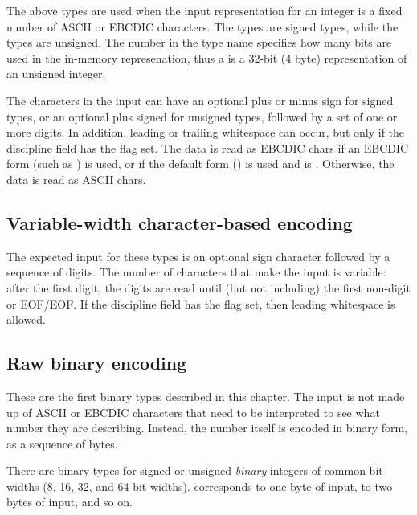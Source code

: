 The above types are used when the input representation for an integer
is a fixed number of ASCII or EBCDIC characters.  The  types are
signed types, while the  types are unsigned.  The number in the
type name specifies how many bits are used in the in-memory
represenation, thus a  is a 32-bit (4 byte) representation of
an unsigned integer.

The characters in the input can have an optional plus or minus sign for
signed types, or an optional plus signed for unsigned types, followed
by a set of one or more digits.   In addition, leading or
trailing whitespace can occur, but only if the \pads{} discipline field
 has the  flag set.
The data is read as EBCDIC chars if an EBCDIC
form (such as ) is used, or if the default form () is used and
 is .  Otherwise, the data is
read as ASCII chars.

\subsection{Variable-width character-based encoding}

\aedBegin{}
\aedEnd{}

The expected input for these types is an optional sign character
followed by a sequence of digits.  The number of characters that make
the input is variable: after the first digit, the digits are read
until (but not including) the first non-digit or EOF/EOF.
If the \pads discipline field
 has the  flag set, then
leading whitespace is allowed.

\subsection{Raw binary encoding}

\bBegin{}
\bEnd{}

These are the first binary types described in this chapter. The input
is not made up of ASCII or EBCDIC characters that need to be interpreted
to see what number they are describing.  Instead, the number itself is
encoded in binary form, as a sequence of bytes.  

There are binary types for signed or unsigned {\em binary\/} integers
of common bit widths (8, 16, 32, and 64 bit widths).   corresponds
to one byte of input,  to two bytes of input, and so on.

